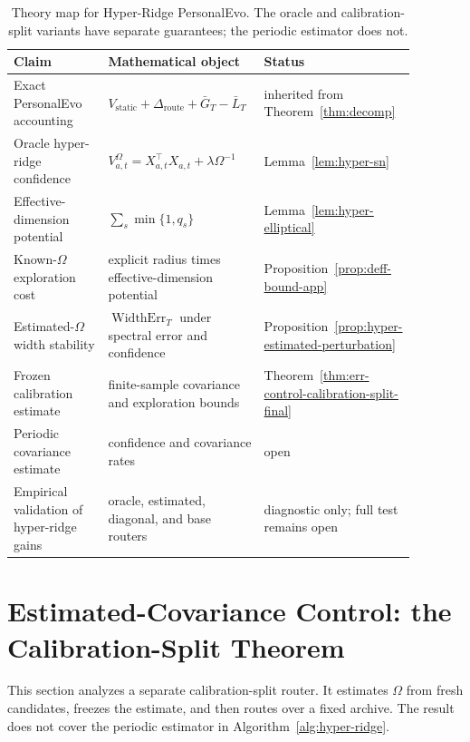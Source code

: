 \documentclass{article} %
\begin{document}
\begin{table}[h]
\centering
\small
\begin{tabular}{
p{0.24\linewidth}
p{0.39\linewidth}
p{0.25\linewidth}}
\toprule
Claim & Mathematical object & Status \\
\midrule
Exact PersonalEvo accounting & \(V_{\mathrm{static}}+\Delta_{\mathrm{route}}+\bar G_T-\bar L_T\) & inherited from Theorem~\ref{thm:decomp} \\
Oracle hyper-ridge confidence & \(V_{a,t}^{\Omega}=X_{a,t}^{\top}X_{a,t}+\lambda\Omega^{-1}\) & Lemma~\ref{lem:hyper-sn} \\
Effective-dimension potential & \(\sum_s \min\{1,q_s\}\) & Lemma~\ref{lem:hyper-elliptical} \\
Known-\(\Omega\) exploration cost & explicit radius times effective-dimension potential & Proposition~\ref{prop:deff-bound-app} \\
Estimated-\(\Omega\) width stability & \(\operatorname{WidthErr}_T\) under spectral error and confidence & Proposition~\ref{prop:hyper-estimated-perturbation} \\
Frozen calibration estimate & finite-sample covariance and exploration bounds & Theorem~\ref{thm:err-control-calibration-split-final} \\
Periodic covariance estimate & confidence and covariance rates & open \\
Empirical validation of hyper-ridge gains & oracle, estimated, diagonal, and base routers & diagnostic only; full test remains open \\
\bottomrule
\end{tabular}
\caption{Theory map for Hyper-Ridge PersonalEvo. The oracle and
calibration-split variants have separate guarantees; the periodic estimator
does not.}
\label{tab:hyper-theory-map}
\end{table}

\section{Estimated-Covariance Control: the Calibration-Split Theorem}
\label{app:err-control-proof}

This section analyzes a separate calibration-split router. It estimates
\(\Omega\) from fresh candidates, freezes the estimate, and then routes over a
fixed archive. The result does not cover the periodic estimator in
Algorithm~\ref{alg:hyper-ridge}.
\end{document}
